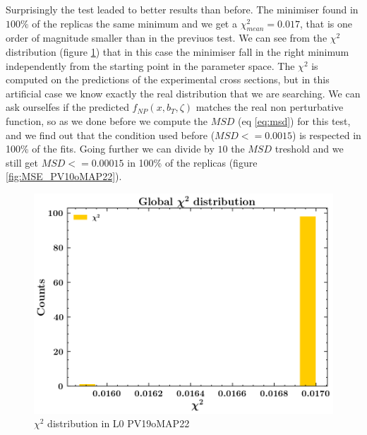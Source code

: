 \documentclass[12pt]{report}
\begin{document}
Surprisingly the test leaded to better results than before. The minimiser found in $100\%$ of the replicas the same minimum and we get a $\chi^2_{mean} = 0.017$, that is one order of magnitude smaller than in the previuos test. We can see from the $\chi^2$ distribution (figure \ref{fig:chi2_dist_2}) that in this case the minimiser fall in the right minimum independently from the starting point in the parameter space. The $\chi^2$ is computed on the predictions of the experimental cross sections, but in this artificial case we know exactly the real distribution that we are searching. We can ask ourselfes if the predicted $f_{NP}(x, b_T, \zeta)$ matches the real non perturbative function, so as we done before we compute the $MSD$ (eq \ref{eq:msd}) for this test, and we find out that the condition used before ($MSD <= 0.0015$) is respected in 100\% of the fits. Going further we can divide by $10$ the $MSD$ treshold and we still get $MSD <= 0.00015$ in 100\% of the replicas (figure \ref{fig:MSE_PV10oMAP22}).   

\begin{figure}[!h]
    \centering
    \includegraphics[scale=0.5]{Images/L0_tests/Globalchi2_PV19oMAP22.png}
    \caption{$\chi^2$ distribution in L0 PV19oMAP22}
    \label{fig:chi2_dist_2}
\end{figure}
\end{document}
